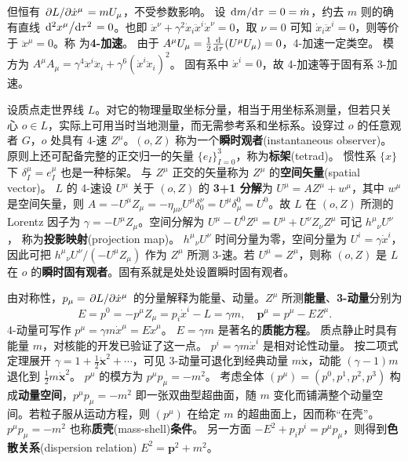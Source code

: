 但恒有 $\pdv*{L}{\dot x^\mu} = m U_\mu$，不受参数影响。
设 $\dv*{m}{\tau}=0=\dot m$，约去 $m$ 则的确有直线 $\dv*[2]{x^\mu}{\tau}=0$。也即 $\ddot x^\nu + \gamma^2\dot{x}_i\ddot{x}^i\dot x^\nu=0$，取 $\nu=0$ 可知 $\dot{x}_i\ddot{x}^i=0$，则等价于 $\ddot x^\mu=0$。称
为\textbf{4-加速}。
由于 $A^\mu U_\mu=\frac 12 \dv{\tau}(U^\mu U_\mu)=0$，4-加速一定类空。
模方为 $A^\mu A_\mu=\gamma^4 \ddot{x}^i\ddot{x}_i+\gamma^6(\dot{x}^i \ddot{x}_i)^2$。
固有系中 $\dot{x}^i=0$，故 4-加速等于固有系 3-加速。

设质点走世界线 $L$。对它的物理量取坐标分量，相当于用坐标系测量，但若只关心 $o\in L$，实际上可用当时当地测量，而无需参考系和坐标系。设穿过 $o$ 的任意观者 $G$，$o$ 处具有 4-速 $Z^\mu$。$(o,Z)$ 称为一个\textbf{瞬时观者}(instantaneous observer)。原则上还可配备完整的正交归一的矢量 $\{e_I\}_{I=0}^3$，称为\textbf{标架}(tetrad)。
惯性系 $\{x\}$ 下 $\delta^\mu_I = e_I^\mu$ 也是一种标架。
与 $Z^\mu$ 正交的矢量称为 $Z^\mu$ 的\textbf{空间矢量}(spatial vector)。
$L$ 的 4-速设 $U^\mu$ 关于 $(o,Z)$ 的 \textbf{3+1 分解}为 $U^\mu = A Z^\mu + w^\mu$，其中 $w^\mu$ 是空间矢量，则 $A=-U^\mu Z_\mu = -\eta_{\mu\nu}U^\mu\delta^\nu_0 = U^\mu\delta^0_\mu = U^0$。故 $L$ 在 $(o,Z)$ 所测的 Lorentz 因子为 $\gamma=-U^\mu Z_\mu$。空间分解为 $U^\mu - U^0 Z^\mu = U^\mu + U^\nu Z_\nu Z^\mu$ 可记 $h^\mu{}_\nu U^\nu$，
称为\textbf{投影映射}(projection map)。
$h^\mu{}_\nu U^\nu$ 时间分量为零，空间分量为 $U^i=\gamma\dot x^i$，因此可把 $h^\mu{}_\nu U^\nu/(-U^\mu Z_\mu)$ 作为 $Z^\mu$ 所测 3-速。若 $U^\mu=Z^\mu$，则称 $(o,Z)$ 是 $L$ 在 $o$ 的\textbf{瞬时固有观者}。固有系就是处处设置瞬时固有观者。

由对称性，$p_\mu=\pdv*{L}{\dot x^\mu}$ 的分量解释为能量、动量。$Z^\mu$ 所测\textbf{能量}、\textbf{3-动量}分别为
\[E=p^0=-p^\mu Z_\mu=p_i \dot{x}^i-L=\gamma m,\quad \bm p^\mu = p^\mu - E Z^\mu.\]
4-动量可写作 $p^\mu=\gamma m \dot x^\mu=E\dot x^\mu$。
$E=\gamma m$ 是著名的\textbf{质能方程}。
质点静止时具有能量 $m$，对核能的开发已验证了这一点。
$p^i=\gamma m \dot{x}^i$ 是相对论性动量。
按二项式定理展开 $\gamma=1+\frac{1}{2} \dot{\bm x}^{2}+\cdots$，可见 3-动量可退化到经典动量 $m \dot{\bm x}$，动能 $(\gamma-1)m$ 退化到 $\frac12 m\dot{\bm x}^{2}$。
$p^\mu$ 的模方为 $p^\mu p_\mu=-m^2$。
考虑全体 $(p^\mu)=(p^0,p^1,p^2,p^3)$ 构成\textbf{动量空间}，$p^\mu p_\mu = -m^2$ 即一张双曲型超曲面，随 $m$ 变化而铺满整个动量空间。若粒子服从运动方程，则 $(p^\mu)$ 在给定 $m$ 的超曲面上，因而称“在壳”。$p^\mu p_\mu=-m^2$ 也称\textbf{质壳}(mass-shell)\textbf{条件}。
另一方面 $-E^2+p_ip^i=p^\mu p_\mu$，则得到\textbf{色散关系}(dispersion relation) $E^2= \bm p^2+m^2$。


